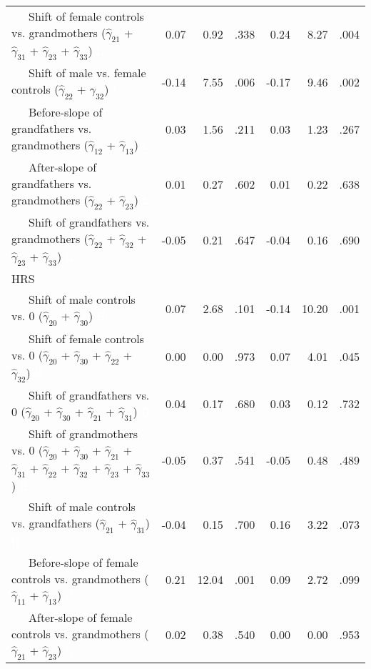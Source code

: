 \documentclass[
  english,
  man, noextraspace]{apa7}
\newenvironment{lltable}{\begin{landscape}\begin{center}\begin{ThreePartTable}}{\end{ThreePartTable}\end{center}\end{landscape}}
\begin{document}
\begin{appendix}
\begin{lltable}
{\begin{longtable}{lrrrrrr}
\ \ \ Shift of female controls vs. grandmothers 
($\hat{\gamma}_{21}$ + $\hat{\gamma}_{31}$ + 
$\hat{\gamma}_{23}$ + $\hat{\gamma}_{33}$) \textcolor{white}{L} & 0.07 & 0.92 & .338 & 0.24 & 8.27 & .004\\
\ \ \ Shift of male vs. female controls 
($\hat{\gamma}_{22}$ + $\hat{\gamma}_{32}$) \textcolor{white}{L} & -0.14 & 7.55 & .006 & -0.17 & 9.46 & .002\\
\ \ \ Before-slope of grandfathers vs. grandmothers 
($\hat{\gamma}_{12}$ + $\hat{\gamma}_{13}$) \textcolor{white}{L} & 0.03 & 1.56 & .211 & 0.03 & 1.23 & .267\\
\ \ \ After-slope of grandfathers vs. grandmothers 
($\hat{\gamma}_{22}$ + $\hat{\gamma}_{23}$) \textcolor{white}{L} & 0.01 & 0.27 & .602 & 0.01 & 0.22 & .638\\
\ \ \ Shift of grandfathers vs. grandmothers 
($\hat{\gamma}_{22}$ + $\hat{\gamma}_{32}$ + 
$\hat{\gamma}_{23}$ + $\hat{\gamma}_{33}$) \textcolor{white}{L} & -0.05 & 0.21 & .647 & -0.04 & 0.16 & .690\\
HRS &  &  &  &  &  & \\
\ \ \ Shift of male controls vs. 0 ($\hat{\gamma}_{20}$ + 
$\hat{\gamma}_{30}$) \textcolor{white}{H} & 0.07 & 2.68 & .101 & -0.14 & 10.20 & .001\\
\ \ \ Shift of female controls vs. 0 ($\hat{\gamma}_{20}$ + 
$\hat{\gamma}_{30}$ + $\hat{\gamma}_{22}$ + 
$\hat{\gamma}_{32}$) \textcolor{white}{H} & 0.00 & 0.00 & .973 & 0.07 & 4.01 & .045\\
\ \ \ Shift of grandfathers vs. 0 ($\hat{\gamma}_{20}$ + 
$\hat{\gamma}_{30}$ + $\hat{\gamma}_{21}$ + 
$\hat{\gamma}_{31}$) \textcolor{white}{H} & 0.04 & 0.17 & .680 & 0.03 & 0.12 & .732\\
\ \ \ Shift of grandmothers vs. 0 ($\hat{\gamma}_{20}$ + 
$\hat{\gamma}_{30}$ + $\hat{\gamma}_{21}$ + 
$\hat{\gamma}_{31}$ + $\hat{\gamma}_{22}$ + 
$\hat{\gamma}_{32}$ + $\hat{\gamma}_{23}$ +
$\hat{\gamma}_{33}$) \textcolor{white}{H} & -0.05 & 0.37 & .541 & -0.05 & 0.48 & .489\\
\ \ \ Shift of male controls vs. grandfathers 
($\hat{\gamma}_{21}$ + $\hat{\gamma}_{31}$) \textcolor{white}{H} & -0.04 & 0.15 & .700 & 0.16 & 3.22 & .073\\
\ \ \ Before-slope of female controls vs. grandmothers 
($\hat{\gamma}_{11}$ + $\hat{\gamma}_{13}$) \textcolor{white}{H} & 0.21 & 12.04 & .001 & 0.09 & 2.72 & .099\\
\ \ \ After-slope of female controls vs. grandmothers 
($\hat{\gamma}_{21}$ + $\hat{\gamma}_{23}$) \textcolor{white}{H} & 0.02 & 0.38 & .540 & 0.00 & 0.00 & .953\\

\end{longtable}}
\end{lltable}
\end{appendix}
\end{document}
